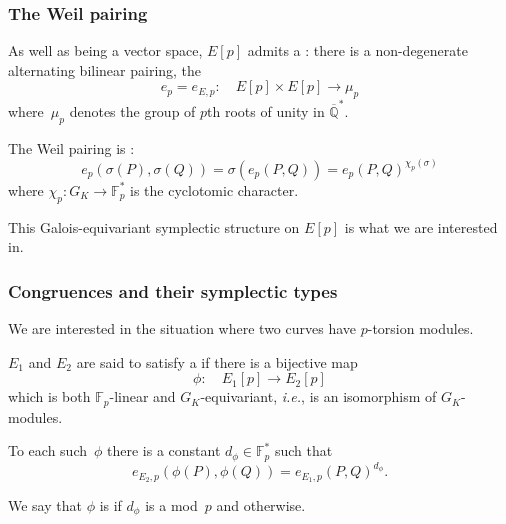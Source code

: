 \documentclass[handout]{beamer}
\newcommand{\Q}{\mathbb Q}
\newcommand{\Qbar}{\overline{\Q}}
\newcommand{\F}{\mathbb F}
\newcommand{\high}[1]{\emph{\color{blue}{#1}}}
\begin{document}
\begin{frame}\frametitle{The Weil pairing}
  As well as being a vector space, $E[p]$ admits a \high{symplectic
    structure}: there is a non-degenerate alternating bilinear
  pairing, the \high{Weil pairing}
  \[
  e_p = e_{E,p}:\quad E[p]\times E[p] \to \mu_p
  \]
  where~$\mu_p$ denotes the group of $p$th roots of unity in
  $\Qbar^*$.
  \pause\medskip

  The Weil pairing is \high{Galois equivariant}:
  \[
  e_p(\sigma(P),\sigma(Q)) = \sigma(e_p(P,Q)) = e_p(P,Q)^{\chi_p(\sigma)}
  \]
  where $\chi_p:G_K\to\F_p^*$ is the cyclotomic character.

  \pause\medskip This Galois-equivariant symplectic structure on $E[p]$ is
  what we are interested in.
\end{frame}

\begin{frame}\frametitle{Congruences and their symplectic types}
  We are interested in the situation where two \high{different} curves have
  \high{isomorphic} $p$-torsion modules.
  \pause\medskip

  $E_1$ and $E_2$ are said to satisfy a \high{mod~$p$ congruence} if
  there is a bijective map
  \[
  \phi:\quad E_1[p] \to E_2[p]
  \]
  which is both $\F_p$-linear and $G_K$-equivariant, \textit{i.e.}, is
  an isomorphism of $G_K$-modules.
  \pause\medskip

  To each such~$\phi$ there is a constant $d_{\phi}\in\F_p^*$ such
  that
  \[
  e_{E_2,p}(\phi(P),\phi(Q)) = e_{E_1,p}(P,Q)^{d_{\phi}}.
  \]

  We say that $\phi$ is \high{symplectic} if $d_{\phi}$ is a
  \high{square} mod~$p$ and \high{anti-symplectic} otherwise.
\end{frame}



\end{document}

